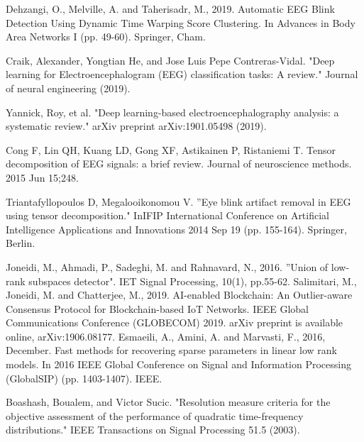 \documentclass{article}
\begin{document}
\begin{small}
\begin{thebibliography}{00}
Dehzangi, O., Melville, A. and Taherisadr, M., 2019. Automatic EEG Blink Detection Using Dynamic Time Warping Score Clustering. In Advances in Body Area Networks I (pp. 49-60). Springer, Cham.
\vspace{-5pt}

Craik, Alexander, Yongtian He, and Jose Luis Pepe Contreras-Vidal. "Deep learning for Electroencephalogram (EEG) classification tasks: A review." Journal of neural engineering (2019).
\vspace{-14pt}

Yannick, Roy, et al. "Deep learning-based electroencephalography analysis: a systematic review." arXiv preprint arXiv:1901.05498 (2019).
\vspace{-5pt}


Cong F, Lin QH, Kuang LD, Gong XF, Astikainen P, Ristaniemi T. Tensor decomposition of EEG signals: a brief review. Journal of neuroscience methods. 2015 Jun 15;248.
\vspace{-5pt}

Triantafyllopoulos D, Megalooikonomou V. ''Eye blink artifact removal in EEG using tensor decomposition." InIFIP International Conference on Artificial Intelligence Applications and Innovations 2014 Sep 19 (pp. 155-164). Springer, Berlin.
\vspace{-5pt}









Joneidi, M., Ahmadi, P., Sadeghi, M. and Rahnavard, N., 2016. ''Union of low-rank subspaces detector". IET Signal Processing, 10(1), pp.55-62.
\vspace{-3pt}
Salimitari, M., Joneidi, M. and Chatterjee, M., 2019. AI-enabled Blockchain: An Outlier-aware Consensus Protocol for Blockchain-based IoT Networks. IEEE Global Communications Conference (GLOBECOM) 2019. arXiv preprint is available online, arXiv:1906.08177.
Esmaeili, A., Amini, A. and Marvasti, F., 2016, December. Fast methods for recovering sparse parameters in linear low rank models. In 2016 IEEE Global Conference on Signal and Information Processing (GlobalSIP) (pp. 1403-1407). IEEE.
\vspace{-5pt}

Boashash, Boualem, and Victor Sucic. "Resolution measure criteria for the objective assessment of the performance of quadratic time-frequency distributions." IEEE Transactions on Signal Processing 51.5 (2003).
\vspace{-5pt}



\end{thebibliography}
\end{small}
\end{document}

